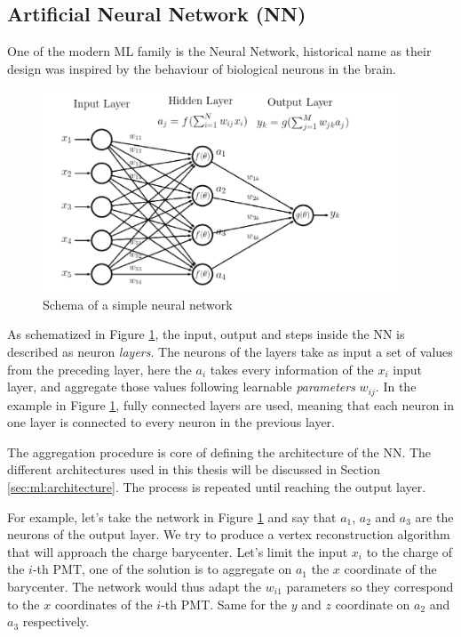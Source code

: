 \documentclass[../main.tex]{subfiles}
\begin{document}
\subsection{Artificial Neural Network (NN)}
\label{sec:ml:nn}

One of the modern ML family is the Neural Network, historical name as their design was inspired by the behaviour of biological neurons in the brain.
\begin{figure}[ht]
  \centering
  \includegraphics[height=6cm]{images/ml/nn_explications.png}
  \caption{Schema of a simple neural network}
  \label{fig:ml:schema_nn}
\end{figure}
As schematized in Figure \ref{fig:ml:schema_nn}, the input, output and steps inside the NN is described as neuron \textit{layers}. The neurons of the layers take as input a set of values from the preceding layer, here the $a_i$ takes every information of the $x_i$ input layer, and aggregate those values following learnable \textit{parameters} $w_{ij}$. In the example in Figure \ref{fig:ml:schema_nn}, fully connected layers are used, meaning that each neuron in one layer is connected to every neuron in the previous layer.

The aggregation procedure is core of defining the architecture of the NN. The different architectures used in this thesis will be discussed in Section \ref{sec:ml:architecture}. The process is repeated until reaching the output layer.

For example, let's take the network in Figure \ref{fig:ml:schema_nn} and say that $a_1$, $a_2$ and $a_3$ are the neurons of the output layer. We try to produce a vertex reconstruction algorithm that will approach the charge barycenter. Let's limit the input $x_i$ to the charge of the $i$-th PMT, one of the solution is to aggregate on $a_1$ the $x$ coordinate of the barycenter. The network would thus adapt the $w_{i1}$ parameters so they correspond to the $x$ coordinates of the $i$-th PMT. Same for the $y$ and $z$ coordinate on $a_2$ and $a_3$ respectively.
\end{document}
